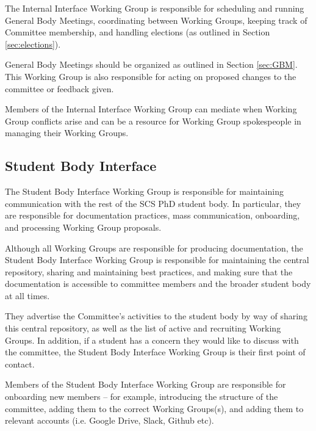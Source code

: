 \documentclass{article}
\begin{document}
The Internal Interface Working Group is responsible for scheduling and running General Body Meetings, coordinating between Working Groups, keeping track of Committee membership, and handling elections (as outlined in Section \ref{sec:elections}).

General Body Meetings should be organized as outlined in Section \ref{sec:GBM}. This Working Group is also responsible for acting on proposed changes to the committee or feedback given.

Members of the Internal Interface Working Group can mediate when Working Group conflicts arise and can be a resource for Working Group spokespeople in managing their Working Groups.


\subsection{Student Body Interface} %

The Student Body Interface Working Group is responsible for maintaining communication with the rest of the SCS PhD student body. In particular, they are responsible for documentation practices, mass communication, onboarding, and processing Working Group proposals.

Although all Working Groups are responsible for producing documentation, the Student Body Interface Working Group is responsible for maintaining the central repository, sharing and maintaining best practices, and making sure that the documentation is accessible to committee members and the broader student body at all times. 

They advertise the Committee's activities to the student body by way of sharing this central repository, as well as the list of active and recruiting Working Groups. In addition, if a student has a concern they would like to discuss with the committee, the Student Body Interface Working Group is their first point of contact.

Members of the Student Body Interface Working Group are responsible for onboarding new members -- for example, introducing the structure of the committee, adding them to the correct Working Groups(s), and adding them to relevant accounts (i.e. Google Drive, Slack, Github etc).
\end{document}
